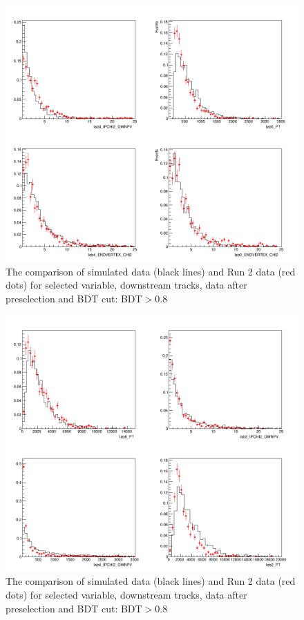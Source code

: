 \begin{figure}[ht]
\includegraphics[width=11.5cm]{figs/MC_Data_Comp/DD8_0.png}
\centering
\caption{The comparison of simulated data (black lines) and Run 2 data (red dots) for selected variable, downstream tracks, data after preselection and BDT cut: BDT$>$0.8}
\label{fig:MC_Data_Comp_DD2_0}
\end{figure}


\begin{figure}[hb]
\includegraphics[width=11.5cm]{figs/MC_Data_Comp/DD8_1.png}
\centering
\caption{The comparison of simulated data (black lines) and Run 2 data (red dots) for selected variable, downstream tracks, data after preselection and BDT cut: BDT$>$0.8}
\label{fig:MC_Data_Comp_DD2_1}
\end{figure}


